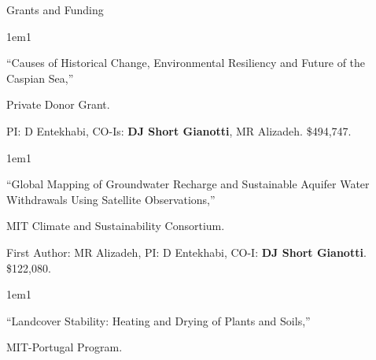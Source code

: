 \begin{rubric}{Grants and Funding}
%
% 
    \begin{hangparas}{1em}{1}
        \par ``Causes of Historical Change, Environmental Resiliency and Future of the Caspian Sea,'' 
        \par Private Donor Grant. 
        \par PI: D Entekhabi, CO-Is: \textbf{DJ Short Gianotti}, MR Alizadeh. \$494,747.
    \end{hangparas}
%
    \begin{hangparas}{1em}{1}
        \par ``Global Mapping of Groundwater Recharge and Sustainable Aquifer Water Withdrawals Using Satellite Observations,'' 
        \par MIT Climate and Sustainability Consortium. 
        \par First Author: MR Alizadeh, PI: D Entekhabi, CO-I: \textbf{DJ Short Gianotti}. \$122,080.
    \end{hangparas}
%
    \begin{hangparas}{1em}{1} 
        \par ``Landcover Stability: Heating and Drying of Plants and Soils,'' 
        \par MIT-Portugal Program. 

\end{hangparas}
\end{rubric}
